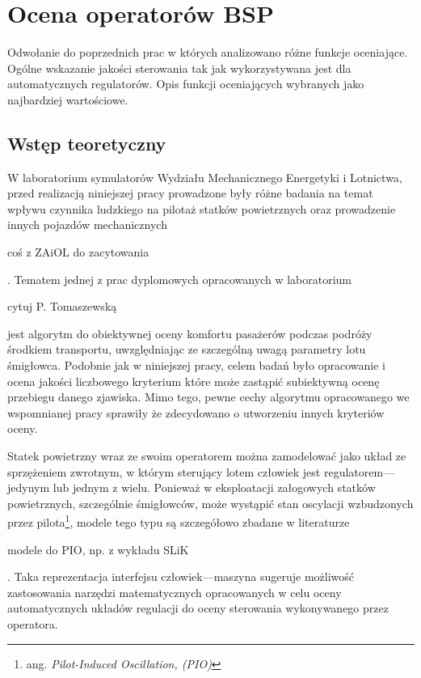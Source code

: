 \newpage
\section{Ocena operatorów BSP}
\begin{todo}
    Odwołanie do poprzednich prac w których analizowano różne funkcje oceniające. Ogólne wskazanie jakości sterowania tak jak wykorzystywana jest dla automatycznych regulatorów. Opis funkcji oceniających wybranych jako najbardziej wartościowe.
\end{todo}

\subsection{Wstęp teoretyczny}
\label{sec:ocena-teoria}
W laboratorium symulatorów Wydziału Mechanicznego Energetyki i Lotnictwa, przed realizacją niniejszej pracy prowadzone były różne badania na temat wpływu czynnika ludzkiego na pilotaż statków powietrznych oraz prowadzenie innych pojazdów mechanicznych \begin{todo}coś z ZAiOL do zacytowania\end{todo}. Tematem jednej z prac dyplomowych opracowanych w laboratorium \begin{todo}cytuj P. Tomaszewską\end{todo} jest algorytm do obiektywnej oceny komfortu pasażerów podczas podróży środkiem transportu, uwzględniając ze szczególną uwagą parametry lotu śmigłowca. Podobnie jak w niniejszej pracy, celem badań było opracowanie i ocena jakości liczbowego kryterium które może zastąpić subiektywną ocenę przebiegu danego zjawiska. Mimo tego, pewne cechy algorytmu opracowanego we wspomnianej pracy sprawiły że zdecydowano o utworzeniu innych kryteriów oceny.

Statek powietrzny wraz ze swoim operatorem można zamodelować jako układ ze sprzężeniem zwrotnym, w którym sterujący lotem człowiek jest regulatorem---jedynym lub jednym z wielu. Ponieważ w eksploatacji załogowych statków powietrznych, szczególnie śmigłowców, może wystąpić stan oscylacji wzbudzonych przez pilota\footnote{ang. \emph{Pilot-Induced Oscillation, (PIO)}}, modele tego typu są szczegółowo zbadane w literaturze \begin{todo}modele do PIO, np. z wykładu SLiK\end{todo}. Taka reprezentacja interfejsu człowiek---maszyna sugeruje możliwość zastosowania narzędzi matematycznych opracowanych w celu oceny automatycznych układów regulacji do oceny sterowania wykonywanego przez operatora.

